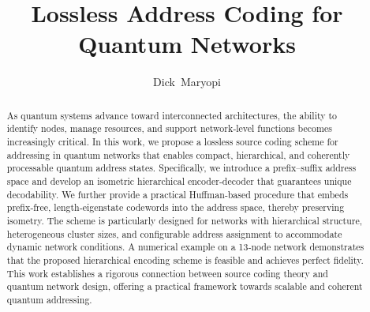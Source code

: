 \documentclass[conference]{IEEEtran}
\begin{document}
%

\title{Lossless Address Coding for Quantum Networks}



\vspace{-0.25cm}
\author[]{Dick~Maryopi}


\vspace{-0.25cm}

\maketitle
\begin{abstract}
As quantum systems advance toward interconnected architectures, the ability to identify nodes, manage resources, and support network‑level functions becomes increasingly critical. In this work, we propose a lossless source coding scheme for addressing in quantum networks that enables compact, hierarchical, and coherently processable quantum address states. Specifically, we introduce a prefix–suffix address space and develop an isometric hierarchical encoder-decoder that guarantees unique decodability. We further provide a practical Huffman‑based procedure that embeds prefix‑free, length‑eigenstate codewords into the address space, thereby preserving isometry. The scheme is particularly designed for networks with hierarchical structure, heterogeneous cluster sizes, and configurable address assignment to accommodate dynamic network conditions. A numerical example on a 13‑node network demonstrates that the proposed hierarchical encoding scheme is feasible and achieves perfect fidelity. This work establishes a rigorous connection between source coding theory and quantum network design, offering a practical framework towards scalable and coherent quantum addressing.
\end{abstract}
\end{document}

